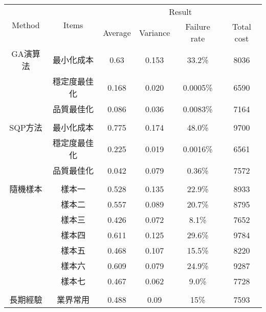 \begin{tabular}{cccccc}
\hline
\multirow{2}{*}{Method}&
\multirow{2}{*}{Items} &
\multicolumn{4}{c}{Result} \\
\cline{3-6}
 & & Average & Variance & Failure rate & Total cost \\
\hline\hline
GA演算法 & 最小化成本 & 0.63 & 0.153 & 33.2\% & 8036 \\ 
& 穩定度最佳化 & 0.168 & 0.020 & 0.0005\% & 6590 \\ 
& 品質最佳化 & 0.086 & 0.036 & 0.0083\% & 7164 \\ 
\\
 SQP方法 & 最小化成本 & 0.775 & 0.174 & 48.0\% & 9700 \\ 
& 穩定度最佳化 & 0.225 & 0.019 & 0.0016\% & 6561 \\ 
& 品質最佳化 & 0.042 & 0.079 & 0.36\% & 7572 \\ 
\\
隨機樣本 & 樣本一 & 0.528 & 0.135 & 22.9\% & 8933\\ 
& 樣本二 & 0.557 & 0.089 & 20.7\% & 8795 \\ 
& 樣本三 & 0.426 & 0.072 & 8.1\% & 7652 \\
& 樣本四 & 0.611 & 0.125 & 29.6\% & 9784 \\ 
& 樣本五 & 0.468 & 0.107 & 15.5\% & 8220 \\ 
& 樣本六 & 0.609 & 0.079 & 24.9\% & 9287 \\ 
& 樣本七 & 0.467 & 0.062 & 9.0\% & 7728 \\ 
\\
長期經驗 & 業界常用 & 0.488 & 0.09 & 15\% & 7593 \\
\hline
\end{tabular}